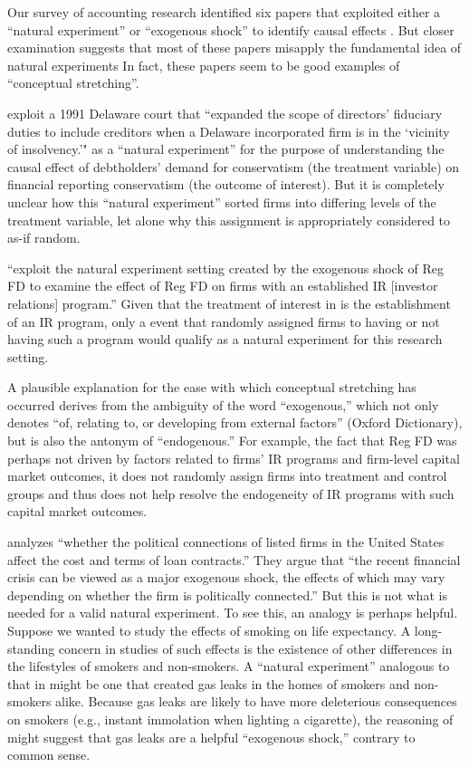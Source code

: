 \documentclass[11pt]{amsart}
\begin{document}
Our survey of accounting research identified six papers that exploited either a ``natural experiment'' or ``exogenous shock'' to identify causal effects \citep{Lo:2013jk,Aier:2014ii,Kirk:2014gx,Houston:2014hv}. %
But closer examination suggests that most of these papers misapply the fundamental idea of natural experiments  In fact, these papers seem to be good examples of ``conceptual stretching''.

\cite{Aier:2014ii} exploit a 1991 Delaware court that ``expanded the scope of directors' fiduciary duties to include creditors when a Delaware incorporated firm is in the `vicinity of insolvency.'" as a ``natural experiment'' for the purpose of understanding the causal effect of debtholders' demand for conservatism (the treatment variable) on financial reporting conservatism (the outcome of interest). But it is completely unclear how this ``natural experiment'' sorted firms into differing levels of the treatment variable, let alone why this assignment is appropriately considered to as-if random.

\citet{Kirk:2014gx} ``exploit the natural experiment setting created by the exogenous shock of Reg FD to examine the effect of Reg FD on firms with an established IR [investor relations] program.'' 
Given that the treatment of interest in \citet{Kirk:2014gx} is the establishment of an IR program, only a event that randomly assigned firms to having or not having such a program would qualify as a natural experiment for this research setting.

A plausible explanation for the ease with which conceptual stretching has occurred derives from the ambiguity of the word ``exogenous,'' which not only denotes  ``of, relating to, or developing from external factors'' (Oxford Dictionary), but is also the antonym of ``endogenous.''
For example, the fact that Reg FD was perhaps not driven by factors related to firms' IR programs and firm-level capital market outcomes, it does not randomly assign firms into treatment and control groups and thus does not help resolve the endogeneity of IR programs with such capital market outcomes.

\cite{Houston:2014hv} analyzes ``whether the political connections of listed firms in the United States affect the cost and terms of loan contracts.'' They argue that ``the recent financial crisis can be viewed as a major exogenous shock, the effects of which may vary depending on whether the firm is politically connected.'' But this is not what is needed for a valid natural experiment. To see this, an analogy is perhaps helpful. Suppose we wanted to study the effects of smoking on life expectancy. A long-standing concern in studies of such effects is the existence of other differences in the lifestyles of smokers and non-smokers. A ``natural experiment'' analogous to that in \cite{Houston:2014hv} might be one that created gas leaks in the homes of smokers and non-smokers alike. Because gas leaks are likely to have more deleterious consequences on smokers (e.g., instant immolation when lighting a cigarette), the reasoning of \cite{Houston:2014hv} might suggest that gas leaks are a helpful ``exogenous shock,'' contrary to common sense. %
\end{document}
